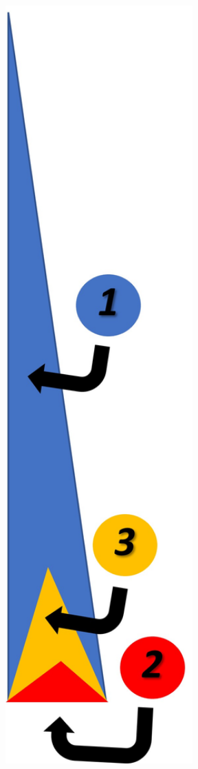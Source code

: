 \documentclass{ximera}
\begin{document}
\begin{exploration}
\begin{image}
         \includegraphics[width=3.5in]{matchedTriangles.jpg}
\end{image}


\end{exploration}
\end{document}

